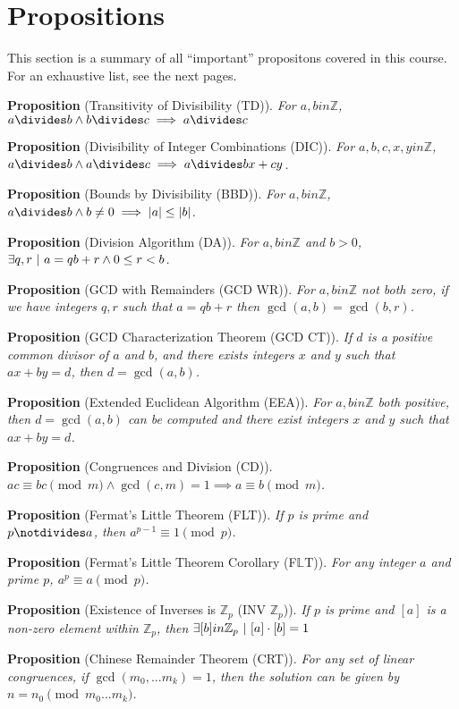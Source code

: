 \documentclass[12pt]{article}
\newcommand{\propositionlist}[2]{{\bf Proposition} (#1). \emph{#2}}
\begin{document}
\newpage

\section*{Propositions}
This section is a summary of all ``important'' propositons covered in this course. For an exhaustive list, see the next pages.

\propositionlist{Transitivity of Divisibility (TD)}{For $a, b in \mathbb{Z}$, $a \divides b \land b \divides c \implies a \divides c$}

\propositionlist{Divisibility of Integer Combinations (DIC)}{For $a,b,c,x,y in \mathbb{Z}$, $a \divides b \land a \divides c \implies a \divides bx + cy$.}

\propositionlist{Bounds by Divisibility (BBD)}{For $a,b in \mathbb{Z}$, $a \divides b \land b \neq 0 \implies |a| \leq |b|$.}

\propositionlist{Division Algorithm (DA)}{For $a,b in \mathbb{Z}$ and $b > 0$, $\exists q,r \ |\  a = qb + r \land 0 \leq r < b$.}

\propositionlist{GCD with Remainders (GCD WR)}{For $a,b in \mathbb{Z}$ not both zero, if we have integers $q,r$ such that $a = qb + r$ then $\gcd(a,b) = \gcd(b,r)$.}

\propositionlist{GCD Characterization Theorem (GCD CT)}{If $d$ is a positive common divisor of $a$ and $b$, and there exists integers $x$ and $y$ such that $ax + by = d$, then $d = \gcd(a,b)$.}

\propositionlist{Extended Euclidean Algorithm (EEA)}{For $a,b in \mathbb{Z}$ both positive, then $d = \gcd(a,b)$ can be computed and there exist integers $x$ and $y$ such that $ax + by = d$.}

\propositionlist{Congruences and Division (CD)}{$ac \equiv bc \pmod m \land \gcd(c,m) = 1 \implies a \equiv b \pmod m$.}

\propositionlist{Fermat's Little Theorem (FLT)}{If $p$ is prime and $p \notdivides a$, then $a^{p-1} \equiv 1 \pmod p$.}

\propositionlist{Fermat's Little Theorem Corollary (F$\mathbb{L}$T)}{For any integer $a$ and prime $p$, $a^p \equiv a \pmod p$.}

\propositionlist{Existence of Inverses is $\mathbb{Z}_p$ (INV $\mathbb{Z}_p$)}{If $p$ is prime and $[a]$ is a non-zero element within $\mathbb{Z}_p$, then $\exists [b] in \mathbb{Z}_p \ |\  [a] \cdot [b] = 1$}

\propositionlist{Chinese Remainder Theorem (CRT)}{For any set of linear congruences, if $\gcd(m_0,...m_k) = 1$, then the solution can be given by $n = n_0 \pmod {m_0...m_k}$.}
\end{document}
